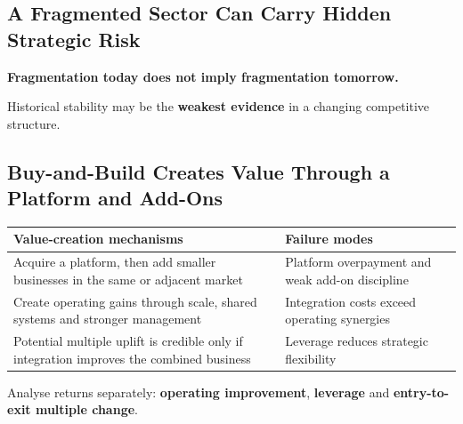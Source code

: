 \subsection{A Fragmented Sector Can Carry Hidden Strategic Risk}
\begin{keybox}
\textbf{Fragmentation today does not imply fragmentation tomorrow.}
\end{keybox}
\begin{center}
\end{center}
\begin{keybox}
Historical stability may be the \textbf{weakest evidence} in a changing competitive structure.
\end{keybox}

\subsection{Buy-and-Build Creates Value Through a Platform and Add-Ons}
\begin{center}
\small
\begin{tabular}{@{}p{7cm}p{7cm}@{}}
\toprule
\textbf{Value-creation mechanisms} & \textbf{Failure modes}\\
\midrule
Acquire a platform, then add smaller businesses in the same or adjacent market & Platform overpayment and weak add-on discipline\\
Create operating gains through scale, shared systems and stronger management & Integration costs exceed operating synergies\\
Potential multiple uplift is credible only if integration improves the combined business & Leverage reduces strategic flexibility\\
\bottomrule
\end{tabular}
\end{center}
\begin{keybox}
Analyse returns separately: \textbf{operating improvement}, \textbf{leverage} and \textbf{entry-to-exit multiple change}.
\end{keybox}

